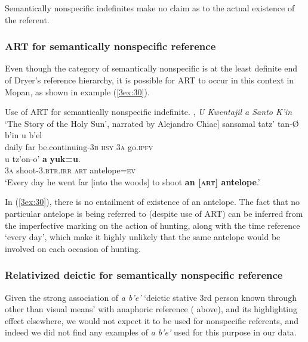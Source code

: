 \documentclass[output=paper]{langsci/langscibook}
\begin{document}
Semantically nonspecific indefinites make no claim as to the actual existence of the referent.  

\subsubsection{ART for semantically nonspecific reference}\label{3sec:351}

Even though the category of semantically nonspecific is at the least definite end of Dryer's reference hierarchy, it is possible for ART to occur in this context in Mopan, as shown in example (\ref{3ex:30}). 

\begin{exe}
\ex\label{3ex:30}
Use of ART for semantically nonspecific indefinite.  \newline
[\cite[][11]{verbeeck:99}, {\emph{U Kwentajil a Santo K'in}} `The Story of the Holy Sun', narrated by Alejandro Chiac]
\exi{}
\gll	sansamal	tatz'	tan-{\O}				b'in		u		b'el \\
	daily		far	be.continuing-{\textsc{3b}}	{\textsc{hsy}}	3{\textsc{a}}	go.{\textsc{ipfv}} \\
\glt
\exi{}
\gll	u		tz'on-o'			{\textbf{a}}	{\textbf{yuk=u}}. \\
	3{\textsc{a}}	shoot-{\textsc{3.btr.irr}}	{\textsc{art}}	antelope={\textsc{ev}} \\
\glt	`Every day he went far [into the woods] to shoot {\textbf{an [{\textsc{art}}] antelope}}.'
\end{exe}

In (\ref{3ex:30}), there is no entailment of existence of an antelope.  The fact that no particular antelope is being referred to (despite use of ART) can be inferred from the imperfective marking on the action of hunting, along with the time reference `every day', which make it highly unlikely that the same antelope would be involved on each occasion of hunting.

\subsubsection{Relativized deictic for semantically nonspecific reference}\label{3sec:352}

Given the strong association of {\emph{a b'e'}} `deictic stative 3rd person known through other than visual means' with anaphoric reference ( above), and its highlighting effect elsewhere, we would not expect it to be used for nonspecific referents, and indeed we did not find any examples of {\emph{a b'e'}} used for this purpose in our data.
\end{document}
